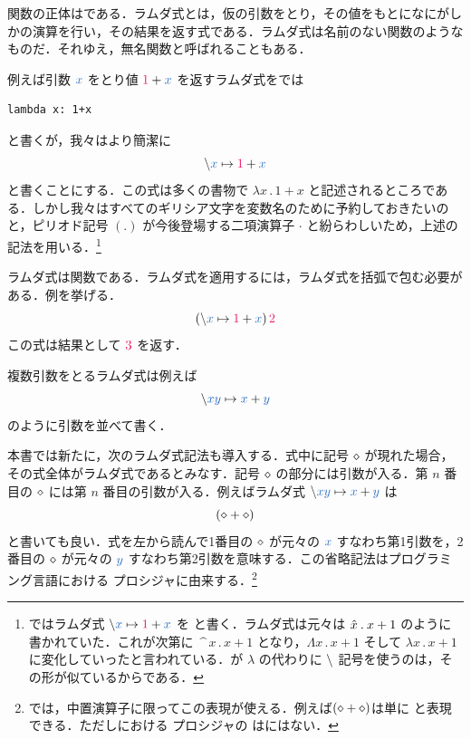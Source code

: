 \documentclass[a5paper,twoside,fleqn,draft]{jsbook}
\begin{document}
関数の正体はである．ラムダ式とは，仮の引数をとり，その値をもとになにがしかの演算を行い，その結果を返す式である．ラムダ式は名前のない関数のようなものだ．それゆえ，無名関数と呼ばれることもある．

例えば引数 $\hVar{x}$ をとり値 $\hConstant{1}+\hVar{x}$ を返すラムダ式を\python では
\begin{pythoncode}
\begin{verbatim}
lambda x: 1+x
\end{verbatim}
\end{pythoncode}
と書くが，我々はより簡潔に
\begin{equation}
  \hLambdaSyntax{\hVar{x}}{\hConstant{1}+\hVar{x}}
\end{equation}
と書くことにする．この式は多くの書物で $\lambda x\mathbin{.}1+x$ と記述されるところである．しかし我々はすべてのギリシア文字を変数名のために予約しておきたいのと，ピリオド記号 $(.)$ が今後登場する二項演算子 $\cdot$ と紛らわしいため，上述の記法を用いる．\footnote{\haskell ではラムダ式 $\hLambdaSyntax{\hVar{x}}{\hConstant{1}+\hVar{x}}$ を  と書く．ラムダ式は元々は $\Hat{x}\mathbin{.}x+1$ のように書かれていた．これが次第に $\mathop{\texttt{\textasciicircum}}x\mathbin{.}x+1$ となり，$\Lambda x\mathbin{.}x+1$ そして $\lambda x\mathbin{.}x+1$ に変化していったと言われている．\haskell が $\lambda$ の代わりに $\backslash$ 記号を使うのは，その形が似ているからである．}

ラムダ式は関数である．ラムダ式を適用するには，ラムダ式を括弧で包む必要がある．例を挙げる．
\begin{equation}
  (\hLambdaSyntax{\hVar{x}}{\hConstant{1}+\hVar{x}})\,\hConstant{2}
\end{equation}
この式は結果として $\hConstant{3}$ を返す．

複数引数をとるラムダ式は例えば
\begin{equation}
  \hLambdaSyntax{\hVar{x}\hVar{y}}{\hVar{x}+\hVar{y}}
\end{equation}
のように引数を並べて書く．

本書では新たに，次のラムダ式記法も導入する．式中に記号 $\diamond$ が現れた場合，その式全体がラムダ式であるとみなす．記号 $\diamond$ の部分には引数が入る．第 $n$ 番目の $\diamond$ には第 $n$ 番目の引数が入る．例えばラムダ式 $\hLambdaSyntax{\hVar{x}\hVar{y}}{\hVar{x}+\hVar{y}}$ は
\begin{equation}
  (\diamond+\diamond)
\end{equation}
と書いても良い．式を左から読んで1番目の $\diamond$ が元々の $\hVar{x}$ すなわち第1引数を，2番目の $\diamond$ が元々の $\hVar{y}$ すなわち第2引数を意味する．この省略記法はプログラミング言語\scheme における  プロシジャに由来する．\footnote{\haskell では，中置演算子に限ってこの表現が使える．例えば$(\diamond+\diamond)$は単に \code{(+)} と表現できる．ただし\scheme における  プロシジャの \code{<>} は\haskell にはない．}
\end{document}
